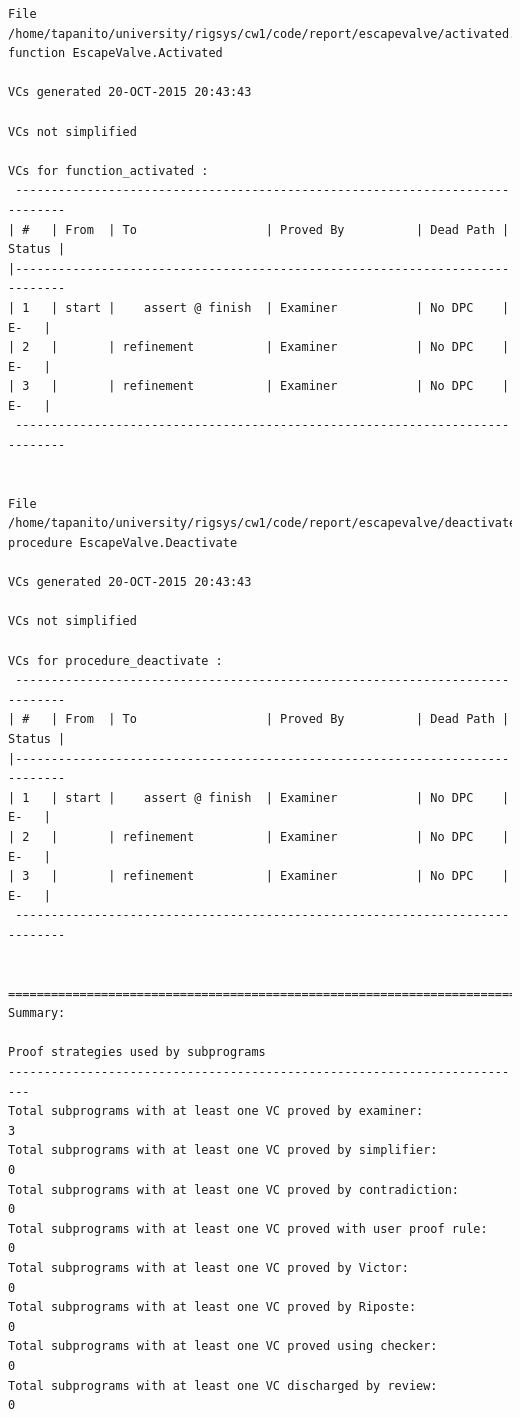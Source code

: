 \documentclass[a4paper, titlepage]{article}
\begin{document}
{\begin{lstlisting}
File /home/tapanito/university/rigsys/cw1/code/report/escapevalve/activated.vcg
function EscapeValve.Activated

VCs generated 20-OCT-2015 20:43:43

VCs not simplified

VCs for function_activated :
 -----------------------------------------------------------------------------
| #   | From  | To                  | Proved By          | Dead Path | Status |
|-----------------------------------------------------------------------------
| 1   | start |    assert @ finish  | Examiner           | No DPC    |   E-   |
| 2   |       | refinement          | Examiner           | No DPC    |   E-   |
| 3   |       | refinement          | Examiner           | No DPC    |   E-   |
 -----------------------------------------------------------------------------


File /home/tapanito/university/rigsys/cw1/code/report/escapevalve/deactivate.vcg
procedure EscapeValve.Deactivate

VCs generated 20-OCT-2015 20:43:43

VCs not simplified

VCs for procedure_deactivate :
 -----------------------------------------------------------------------------
| #   | From  | To                  | Proved By          | Dead Path | Status |
|-----------------------------------------------------------------------------
| 1   | start |    assert @ finish  | Examiner           | No DPC    |   E-   |
| 2   |       | refinement          | Examiner           | No DPC    |   E-   |
| 3   |       | refinement          | Examiner           | No DPC    |   E-   |
 -----------------------------------------------------------------------------


===============================================================================
Summary:

Proof strategies used by subprograms
-------------------------------------------------------------------------
Total subprograms with at least one VC proved by examiner:              3
Total subprograms with at least one VC proved by simplifier:            0
Total subprograms with at least one VC proved by contradiction:         0
Total subprograms with at least one VC proved with user proof rule:     0
Total subprograms with at least one VC proved by Victor:                0
Total subprograms with at least one VC proved by Riposte:               0
Total subprograms with at least one VC proved using checker:            0
Total subprograms with at least one VC discharged by review:            0


\end{lstlisting}}
\end{document}
